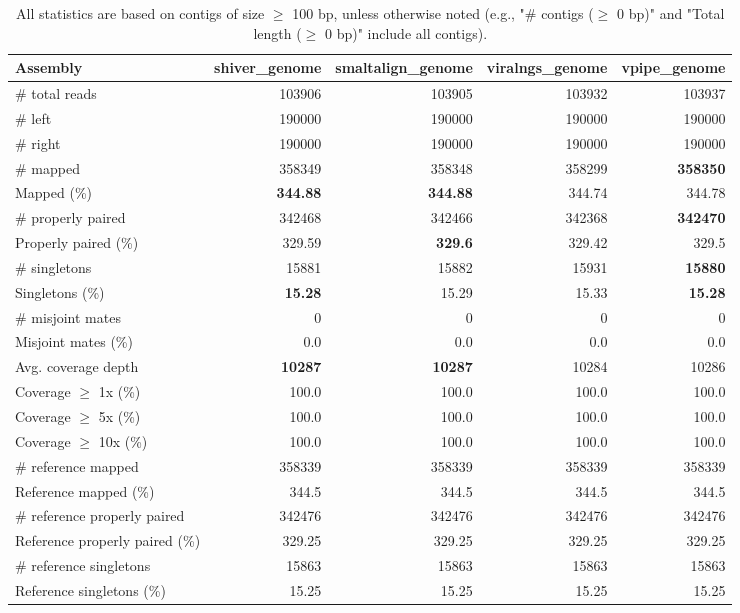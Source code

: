 \documentclass[12pt,a4paper]{article}
\begin{document}
\begin{table}[ht]
\begin{center}
\caption{All statistics are based on contigs of size $\geq$ 100 bp, unless otherwise noted (e.g., "\# contigs ($\geq$ 0 bp)" and "Total length ($\geq$ 0 bp)" include all contigs).}
\begin{tabular}{|l*{4}{|r}|}
\hline
Assembly & shiver\_genome & smaltalign\_genome & viralngs\_genome & vpipe\_genome \\ \hline
\# total reads & 103906 & 103905 & 103932 & 103937 \\ \hline
\# left & 190000 & 190000 & 190000 & 190000 \\ \hline
\# right & 190000 & 190000 & 190000 & 190000 \\ \hline
\# mapped & 358349 & 358348 & 358299 & {\bf 358350} \\ \hline
Mapped (\%) & {\bf 344.88} & {\bf 344.88} & 344.74 & 344.78 \\ \hline
\# properly paired & 342468 & 342466 & 342368 & {\bf 342470} \\ \hline
Properly paired (\%) & 329.59 & {\bf 329.6} & 329.42 & 329.5 \\ \hline
\# singletons & 15881 & 15882 & 15931 & {\bf 15880} \\ \hline
Singletons (\%) & {\bf 15.28} & 15.29 & 15.33 & {\bf 15.28} \\ \hline
\# misjoint mates & 0 & 0 & 0 & 0 \\ \hline
Misjoint mates (\%) & 0.0 & 0.0 & 0.0 & 0.0 \\ \hline
Avg. coverage depth & {\bf 10287} & {\bf 10287} & 10284 & 10286 \\ \hline
Coverage $\geq$ 1x (\%) & 100.0 & 100.0 & 100.0 & 100.0 \\ \hline
Coverage $\geq$ 5x (\%) & 100.0 & 100.0 & 100.0 & 100.0 \\ \hline
Coverage $\geq$ 10x (\%) & 100.0 & 100.0 & 100.0 & 100.0 \\ \hline
\# reference mapped & 358339 & 358339 & 358339 & 358339 \\ \hline
Reference mapped (\%) & 344.5 & 344.5 & 344.5 & 344.5 \\ \hline
\# reference properly paired & 342476 & 342476 & 342476 & 342476 \\ \hline
Reference properly paired (\%) & 329.25 & 329.25 & 329.25 & 329.25 \\ \hline
\# reference singletons & 15863 & 15863 & 15863 & 15863 \\ \hline
Reference singletons (\%) & 15.25 & 15.25 & 15.25 & 15.25 \\ \hline

\end{tabular}
\end{center}
\end{table}
\end{document}

